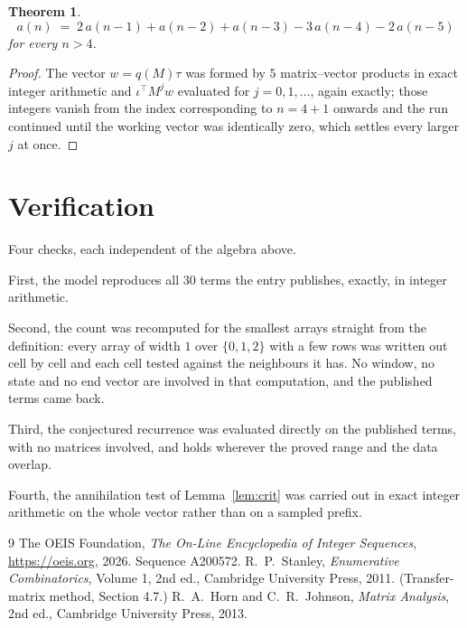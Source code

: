 \documentclass[11pt,a4paper]{article}
\theoremstyle{plain}
\newtheorem{theorem}{Theorem}
\theoremstyle{definition}
\begin{document}
\begin{theorem}
\[
a(n)\;=\;2\,a(n-1) + a(n-2) + a(n-3) - 3\,a(n-4) - 2\,a(n-5)
\]
for every $n>4$.
\end{theorem}

\begin{proof}
The vector $w=q(M)\tau$ was formed by $5$ matrix--vector products in exact integer
arithmetic and $\iota^{\!\top}M^{j}w$ evaluated for $j=0,1,\dots$, again exactly; those
integers vanish from the index corresponding to $n=4+1$ onwards and the run continued
until the working vector was identically zero, which settles every larger $j$ at once.
\end{proof}

\section{Verification}

Four checks, each independent of the algebra above.

First, the model reproduces all $30$ terms the entry publishes, exactly, in integer
arithmetic.

Second, the count was recomputed for the smallest arrays straight from the definition: every
array of width $1$ over $\{0,1,2\}$ with a few rows was written out cell by cell and each cell
tested against the neighbours it has. No window, no state and no end vector are involved in that
computation, and the published terms came back.

Third, the conjectured recurrence was evaluated directly on the published terms, with no
matrices involved, and holds wherever the proved range and the data overlap.

Fourth, the annihilation test of Lemma~\ref{lem:crit} was carried out in exact integer
arithmetic on the whole vector rather than on a sampled prefix.

\begin{thebibliography}{9}
 The OEIS Foundation, \emph{The On-Line Encyclopedia of Integer
Sequences}, \url{https://oeis.org}, 2026. Sequence A200572.
 R.~P.~Stanley, \emph{Enumerative Combinatorics}, Volume 1, 2nd ed.,
Cambridge University Press, 2011. (Transfer-matrix method, Section 4.7.)
 R.~A.~Horn and C.~R.~Johnson, \emph{Matrix Analysis}, 2nd ed., Cambridge
University Press, 2013.
\end{thebibliography}
\end{document}
